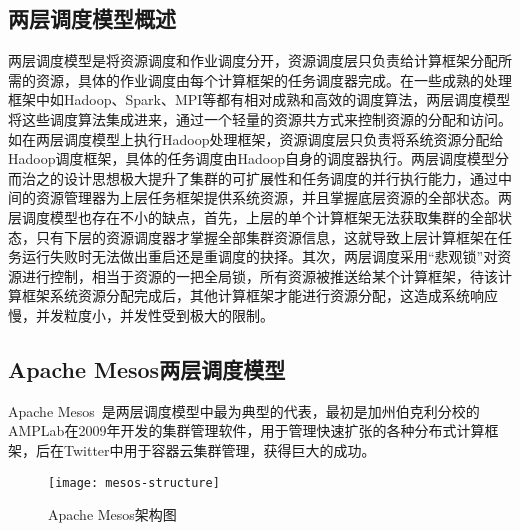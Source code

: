 \subsection{两层调度模型概述}
两层调度模型是将资源调度和作业调度分开，资源调度层只负责给计算框架分配所需的资源，具体的作业调度由每个计算框架的任务调度器完成。在一些成熟的处理框架中如Hadoop、Spark、MPI等都有相对成熟和高效的调度算法，两层调度模型将这些调度算法集成进来，通过一个轻量的资源共方式来控制资源的分配和访问。如在两层调度模型上执行Hadoop处理框架，资源调度层只负责将系统资源分配给Hadoop调度框架，具体的任务调度由Hadoop自身的调度器执行。两层调度模型分而治之的设计思想极大提升了集群的可扩展性和任务调度的并行执行能力，通过中间的资源管理器为上层任务框架提供系统资源，并且掌握底层资源的全部状态。两层调度模型也存在不小的缺点，首先，上层的单个计算框架无法获取集群的全部状态，只有下层的资源调度器才掌握全部集群资源信息，这就导致上层计算框架在任务运行失败时无法做出重启还是重调度的抉择。其次，两层调度采用“悲观锁”对资源进行控制，相当于资源的一把全局锁，所有资源被推送给某个计算框架，待该计算框架系统资源分配完成后，其他计算框架才能进行资源分配，这造成系统响应慢，并发粒度小，并发性受到极大的限制。

\subsection{Apache Mesos两层调度模型}
Apache Mesos~\cite{Mesos2011}是两层调度模型中最为典型的代表，最初是加州伯克利分校的AMPLab在2009年开发的集群管理软件，用于管理快速扩张的各种分布式计算框架，后在Twitter中用于容器云集群管理，获得巨大的成功。

\begin{figure}[H] %
	\centering
	\texttt{[image: mesos-structure]}
	\caption{Apache Mesos架构图~\cite{Mesos2011}}
\end{figure}

